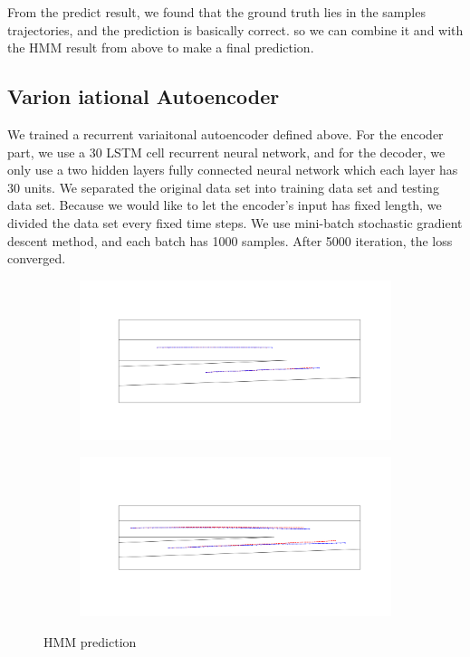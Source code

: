 \documentclass[conference]{IEEEtran}
\begin{document}
From the predict result, we found that the ground truth lies in the samples trajectories, and the prediction is basically correct. so we can combine it and with the HMM result from above to make a final prediction. \subsection{Varion iational Autoencoder}
We trained a recurrent variaitonal autoencoder defined above. For the encoder part, we use a 30 LSTM cell recurrent neural network, and for the decoder, we only use a two hidden layers fully connected neural network which each layer has 30 units. We separated the original data set into training data set and testing data set. Because we would like to let the encoder's input has fixed length, we divided the data set every fixed time steps. We use mini-batch stochastic gradient descent method, and each batch has 1000 samples. After 5000 iteration, the loss converged.
\begin{figure}[h]
	\centering
\begin{subfigure}[h]{\textwidth}
	\includegraphics[scale = 0.17]{vae_k_1_2s.png}
\end{subfigure}
\begin{subfigure}[h]{\textwidth}
	\includegraphics[scale = 0.17]{vae_k_1_4s.png}
\end{subfigure}
    \caption{HMM prediction}
	\label{fig:hmmPred}
\end{figure}
\end{document}

